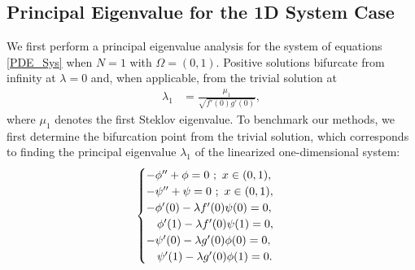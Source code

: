 \documentclass[12pt, reqno]{amsart}
\numberwithin{equation}{section}
\begin{document}

\subsection{Principal Eigenvalue for the 1D System Case}
We first perform a principal eigenvalue analysis for the system of equations \eqref{PDE_Sys} when $N=1$ with $\Omega = (0,1)$. 
Positive solutions bifurcate from infinity at $\lambda = 0$ and, when applicable, from the trivial solution at 
\begin{align} \label{system_lambda1}
    \lambda_1 &= \frac{\mu_1}{\sqrt{f'(0)g'(0)}},
\end{align} 
where $\mu_1$ denotes the first Steklov eigenvalue. 
To benchmark our methods, we first determine the bifurcation point from the trivial solution, which corresponds to finding the principal eigenvalue $\lambda_1$ of the linearized one-dimensional system:
\begin{align*}
    \begin{cases}
        -\phi'' + \phi = 0 ~;~ x \in (0,1) , \\
        -\psi'' + \psi = 0 ~;~ x \in (0,1) , \\
        -\phi'(0) - \lambda f'(0) \psi(0) = 0 , & \\
        \hspace{.13in} \phi'(1) - \lambda f'(0) \psi(1) = 0 , &  \\
        -\psi'(0) - \lambda g'(0) \phi(0) = 0 , & \\
        \hspace{.13in} \psi'(1) - \lambda g'(0) \phi(1) = 0. & 
    \end{cases}
\end{align*}
\end{document}
